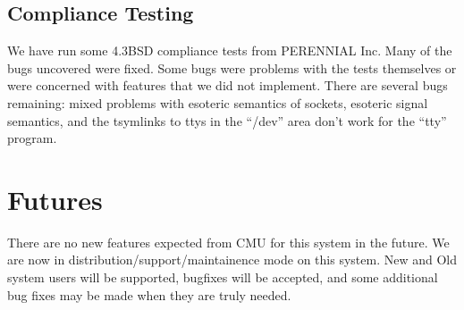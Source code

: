 \subsection{Compliance Testing}
We have run some 4.3BSD compliance tests from PERENNIAL Inc.
Many of the bugs uncovered were fixed.  Some bugs were problems with
the tests themselves or were concerned with features that
we did not implement.  There are several bugs remaining:  mixed problems with
esoteric semantics of sockets, esoteric signal semantics, and the tsymlinks
to ttys in the ``/dev'' area don't work for the ``tty'' program.

\section{Futures}
There are no new features expected from CMU for this system in the future.
We are now in distribution/support/maintainence mode on this system.
New and Old
system users will be supported, bugfixes will be accepted, and some
additional bug fixes may be made when they are truly needed.

